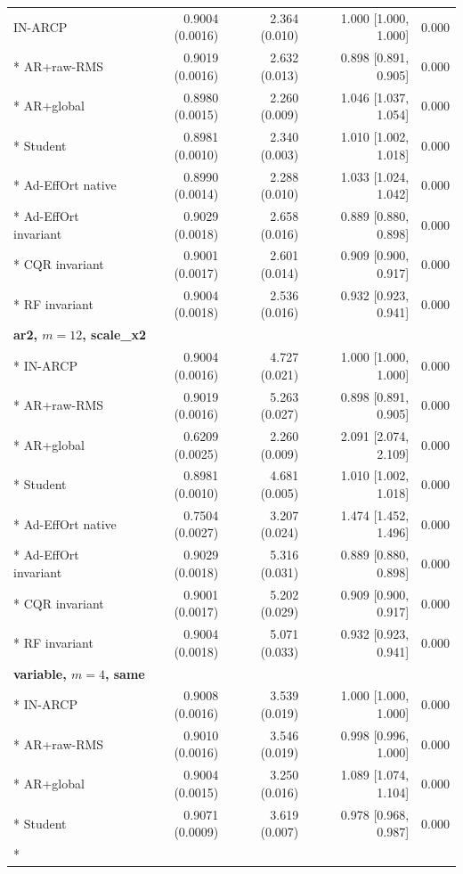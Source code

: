 \begin{longtable}{lrrrr}
IN-ARCP & 0.9004 (0.0016) & 2.364 (0.010) & 1.000 [1.000, 1.000] & 0.000 \\*
AR+raw-RMS & 0.9019 (0.0016) & 2.632 (0.013) & 0.898 [0.891, 0.905] & 0.000 \\*
AR+global & 0.8980 (0.0015) & 2.260 (0.009) & 1.046 [1.037, 1.054] & 0.000 \\*
Student & 0.8981 (0.0010) & 2.340 (0.003) & 1.010 [1.002, 1.018] & 0.000 \\*
Ad-EffOrt native & 0.8990 (0.0014) & 2.288 (0.010) & 1.033 [1.024, 1.042] & 0.000 \\*
Ad-EffOrt invariant & 0.9029 (0.0018) & 2.658 (0.016) & 0.889 [0.880, 0.898] & 0.000 \\*
CQR invariant & 0.9001 (0.0017) & 2.601 (0.014) & 0.909 [0.900, 0.917] & 0.000 \\*
RF invariant & 0.9004 (0.0018) & 2.536 (0.016) & 0.932 [0.923, 0.941] & 0.000 \\
\midrule
\multicolumn{5}{l}{\textbf{ar2, $m=12$, scale\_x2}}\\*
IN-ARCP & 0.9004 (0.0016) & 4.727 (0.021) & 1.000 [1.000, 1.000] & 0.000 \\*
AR+raw-RMS & 0.9019 (0.0016) & 5.263 (0.027) & 0.898 [0.891, 0.905] & 0.000 \\*
AR+global & 0.6209 (0.0025) & 2.260 (0.009) & 2.091 [2.074, 2.109] & 0.000 \\*
Student & 0.8981 (0.0010) & 4.681 (0.005) & 1.010 [1.002, 1.018] & 0.000 \\*
Ad-EffOrt native & 0.7504 (0.0027) & 3.207 (0.024) & 1.474 [1.452, 1.496] & 0.000 \\*
Ad-EffOrt invariant & 0.9029 (0.0018) & 5.316 (0.031) & 0.889 [0.880, 0.898] & 0.000 \\*
CQR invariant & 0.9001 (0.0017) & 5.202 (0.029) & 0.909 [0.900, 0.917] & 0.000 \\*
RF invariant & 0.9004 (0.0018) & 5.071 (0.033) & 0.932 [0.923, 0.941] & 0.000 \\
\midrule
\multicolumn{5}{l}{\textbf{variable, $m=4$, same}}\\*
IN-ARCP & 0.9008 (0.0016) & 3.539 (0.019) & 1.000 [1.000, 1.000] & 0.000 \\*
AR+raw-RMS & 0.9010 (0.0016) & 3.546 (0.019) & 0.998 [0.996, 1.000] & 0.000 \\*
AR+global & 0.9004 (0.0015) & 3.250 (0.016) & 1.089 [1.074, 1.104] & 0.000 \\*
Student & 0.9071 (0.0009) & 3.619 (0.007) & 0.978 [0.968, 0.987] & 0.000 \\*

\end{longtable}
